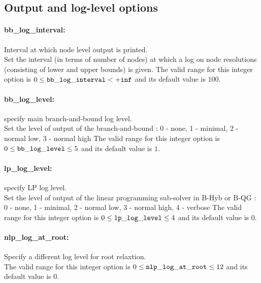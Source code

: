 \subsection{Output and log-level options}
\label{sec:Output_and_log-level_options}
\paragraph{\bf bb\_log\_interval:}\label{sec:bb_log_interval} Interval at which node level output is printed. $\;$ \\
 Set the interval (in terms of number of nodes) at
which a log on node resolutions (consisting of
lower and upper bounds) is given. The valid range for this integer option is
$0 \le {\tt bb\_log\_interval } <  {\tt +inf}$
and its default value is $100$.


\paragraph{\bf bb\_log\_level:}\label{sec:bb_log_level} specify main branch-and-bound log level. $\;$ \\
 Set the level of output of the branch-and-bound :
0 - none, 1 - minimal, 2 - normal low, 3 - normal
high The valid range for this integer option is
$0 \le {\tt bb\_log\_level } \le 5$
and its default value is $1$.


\paragraph{\bf lp\_log\_level:}\label{sec:lp_log_level} specify LP log level. $\;$ \\
 Set the level of output of the linear programming
sub-solver in B-Hyb or B-QG : 0 - none, 1 -
minimal, 2 - normal low, 3 - normal high, 4 -
verbose The valid range for this integer option is
$0 \le {\tt lp\_log\_level } \le 4$
and its default value is $0$.


\paragraph{\bf nlp\_log\_at\_root:}\label{sec:nlp_log_at_root}  Specify a different log level for root relaxtion. $\;$ \\
 The valid range for this integer option is
$0 \le {\tt nlp\_log\_at\_root } \le 12$
and its default value is $0$.


